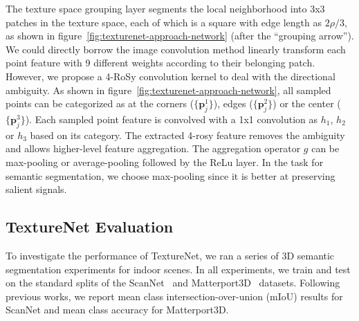 The texture space grouping layer segments the local neighborhood into 3x3 patches in the texture space, each of which is a square with edge length as $2\rho/3$, as shown in figure~\ref{fig:texturenet-approach-network} (after the ``grouping arrow''). We could directly borrow the image convolution method linearly transform each point feature with 9 different weights according to their belonging patch. However, we propose a 4-RoSy convolution kernel to deal with the directional ambiguity. As shown in figure~\ref{fig:texturenet-approach-network}, all sampled points can be categorized as at the corners ($\{\mathbf{p}_j^1\}$), edges ($\{\mathbf{p}_j^2\}$) or the center ($\{\mathbf{p}_j^3\}$). Each sampled point feature is convolved with a 1x1 convolution as $h_1$, $h_2$ or $h_3$ based on its category. The extracted 4-rosy feature removes the ambiguity and allows higher-level feature aggregation. The  aggregation operator $g$ can be max-pooling or average-pooling followed by the ReLu layer. In the task for semantic segmentation, we choose max-pooling since it is better at preserving salient signals.

\subsection{TextureNet Evaluation}

To investigate the performance of TextureNet, we ran a series of 3D semantic segmentation experiments for indoor scenes.   In all experiments, we train and test on the standard splits of the ScanNet~\cite{dai2017scannet} and Matterport3D~\cite{dai2017scannet} datasets.  Following previous works, we report mean class intersection-over-union (mIoU) results for ScanNet and mean class accuracy for Matterport3D.

\label{sec:texturenet-eval-result}

